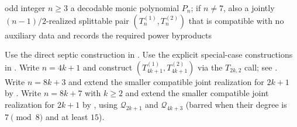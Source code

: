 \begin{algorithm}[H]
  \caption{Final odd-degree construction}\label{alg:final-construction}
  \begin{algorithmic}
    \Require odd integer $n\ge 3$
    \Ensure a decodable monic polynomial $P_n$; if $n\ne7$, also a
    jointly $(n-1)/2$-realized splittable pair
    $(T^{(1)}_n,T^{(2)}_n)$ that is compatible with no auxiliary data and
    records the required power byproducts

      \State Use the direct septic construction in .
      \State Use the explicit special-case constructions in .
      \State Write $n=4k+1$ and construct $(T^{(1)}_{4k+1},T^{(2)}_{4k+1})$ via the $T_{2k,2}$ call; see .
      \State Write $n=8k+3$ and extend the smaller compatible joint realization for $2k+1$ by .
    \Else
      \State Write $n=8k+7$ with $k\ge 2$ and extend the smaller compatible joint realization for $2k+1$ by , using $\mathcal Q_{2k+1}$ and $\mathcal Q_{4k+3}$ (barred when their degree is $7\pmod8$ and at least $15$).
    \EndIf
  \end{algorithmic}
\end{algorithm}

